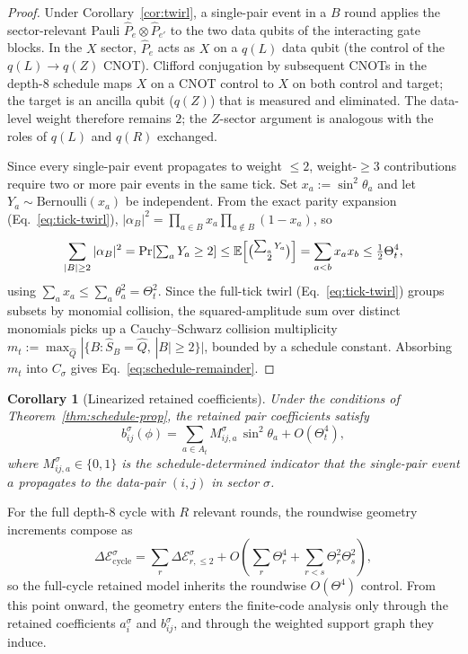 \documentclass[
aps,
prx,
10pt,
twocolumn,
groupedaddress,
longbibliography,
nofootinbib,
floatfix
]{revtex4-2}
\newtheorem{corollary}{Corollary}
\theoremstyle{definition}
\begin{document}
\begin{proof}
Under Corollary~\ref{cor:twirl}, a single-pair event in a $B$ round applies the sector-relevant Pauli $\hat P_e\otimes\hat P_{e'}$ to the two data qubits of the interacting gate blocks. In the $X$ sector, $\hat P_e$ acts as $X$ on a $q(L)$ data qubit (the control of the $q(L)\to q(Z)$ CNOT). Clifford conjugation by subsequent CNOTs in the depth-$8$ schedule maps $X$ on a CNOT control to $X$ on both control and target; the target is an ancilla qubit ($q(Z)$) that is measured and eliminated. The data-level weight therefore remains $2$; the $Z$-sector argument is analogous with the roles of $q(L)$ and $q(R)$ exchanged.

Since every single-pair event propagates to weight $\le 2$, weight-$\ge 3$ contributions require two or more pair events in the same tick. Set $x_a:=\sin^2\theta_a$ and let $Y_a\sim\mathrm{Bernoulli}(x_a)$ be independent. From the exact parity expansion (Eq.~\eqref{eq:tick-twirl}), $|\alpha_B|^2=\prod_{a\in B}x_a\prod_{a\notin B}(1-x_a)$, so
\begin{equation}
\sum_{|B|\ge 2}|\alpha_B|^2 = \Pr\!\left[\textstyle\sum_a Y_a\ge 2\right] \le \mathbb{E}\!\left[\tbinom{\sum_a Y_a}{2}\right] = \sum_{a<b}x_a x_b \le \tfrac{1}{2}\Theta_t^4,
\end{equation}
using $\sum_a x_a\le\sum_a\theta_a^2=\Theta_t^2$. Since the full-tick twirl (Eq.~\eqref{eq:tick-twirl}) groups subsets by monomial collision, the squared-amplitude sum over distinct monomials picks up a Cauchy--Schwarz collision multiplicity $m_t:=\max_{\hat Q}|\{B:\hat S_B=\hat Q,\,|B|\ge 2\}|$, bounded by a schedule constant. Absorbing $m_t$ into $C_\sigma$ gives Eq.~\eqref{eq:schedule-remainder}.
\end{proof}

\begin{corollary}[Linearized retained coefficients]
\label{cor:linearized}
Under the conditions of Theorem~\ref{thm:schedule-prop}, the retained pair coefficients satisfy
\begin{equation}
b_{ij}^{\sigma}(\phi) = \sum_{a\in A_t} M_{ij,a}^{\sigma}\,\sin^2\theta_a + O\!\left(\Theta_t^4\right),
\end{equation}
where $M_{ij,a}^{\sigma}\in\{0,1\}$ is the schedule-determined indicator that the single-pair event $a$ propagates to the data-pair $(i,j)$ in sector $\sigma$.
\end{corollary}

For the full depth-$8$ cycle with $R$ relevant rounds, the roundwise geometry increments compose as
\begin{equation}
\Delta\mathcal{E}_{\mathrm{cycle}}^{\sigma} = \sum_r \Delta\mathcal{E}_{r,\le 2}^{\sigma} + O\!\left(\sum_r \Theta_r^4 + \sum_{r<s}\Theta_r^2\Theta_s^2\right),
\label{eq:cycle-compose}
\end{equation}
so the full-cycle retained model inherits the roundwise $O(\Theta^4)$ control. From this point onward, the geometry enters the finite-code analysis only through the retained coefficients $a_i^\sigma$ and $b_{ij}^\sigma$, and through the weighted support graph they induce.
\end{document}
